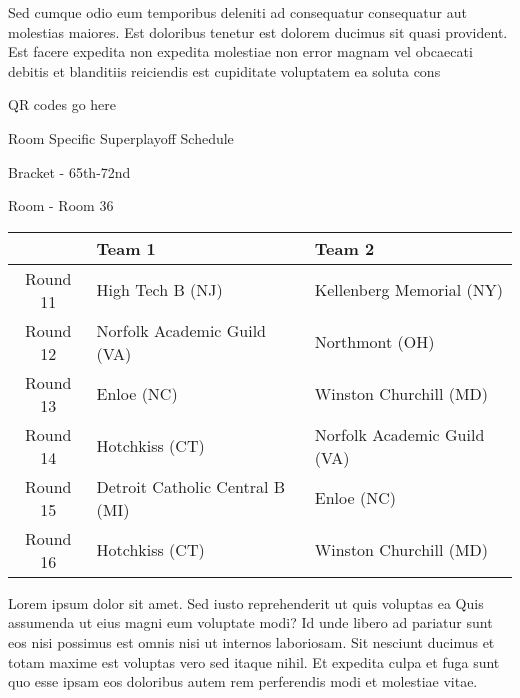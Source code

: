 \documentclass{article}%
\begin{document}
\newline%
    Sed cumque odio eum temporibus deleniti ad consequatur consequatur aut molestias maiores. Est doloribus tenetur est dolorem ducimus sit quasi provident. Est facere expedita non expedita molestiae non error magnam vel obcaecati debitis et blanditiis reiciendis est cupiditate voluptatem ea soluta cons%
\vspace*{140pt}%
\begin{center}%
\begin{Huge}%
QR codes go here%
\end{Huge}%
\end{center}%
\newpage%
\begin{center}%
\begin{Huge}%
Room Specific Superplayoff Schedule%
\end{Huge}%
\vspace*{8pt}%
\linebreak%
\begin{Large}%
Bracket {-} 65th{-}72nd%
\end{Large}%
\vspace*{8pt}%
\linebreak%
\vspace*{8pt}%
\begin{Large}%
Room {-} Room 36%
\end{Large}%
\end{center}%
%
\begin{tabularx}{\textwidth}{|c|Y|Y|}%
\hline%
&Team 1&Team 2\\%
\hline%
Round 11&High Tech B (NJ)&Kellenberg Memorial (NY)\\%
Round 12&Norfolk Academic Guild (VA)&Northmont (OH)\\%
Round 13&Enloe (NC)&Winston Churchill (MD)\\%
Round 14&Hotchkiss (CT)&Norfolk Academic Guild (VA)\\%
Round 15&Detroit Catholic Central B (MI)&Enloe (NC)\\%
Round 16&Hotchkiss (CT)&Winston Churchill (MD)\\%
\hline%
\end{tabularx}%
\vspace*{8pt}%
\newline%
    Lorem ipsum dolor sit amet. Sed iusto reprehenderit ut quis voluptas ea Quis assumenda ut eius magni eum voluptate modi? Id unde libero ad pariatur sunt eos nisi possimus est omnis nisi ut internos laboriosam. Sit nesciunt ducimus et totam maxime est voluptas vero sed itaque nihil. Et expedita culpa et fuga sunt quo esse ipsam eos doloribus autem rem perferendis modi et molestiae vitae.\newline%
\end{document}
